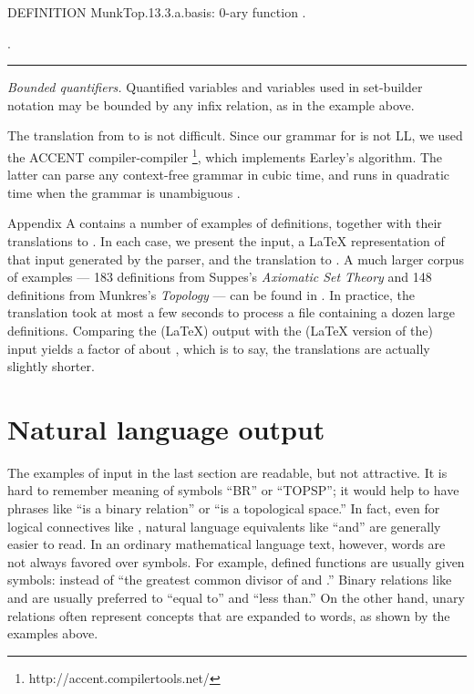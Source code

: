 \documentclass{llncs}
\newcommand{\myrule}{\noindent \rule{\textwidth}{0.3mm}}
\begin{document}
\noindent DEFINITION MunkTop.13.3.a.basis: 0-ary function
.

\noindent .

\myrule

\bigskip

\noindent \emph{Bounded quantifiers.} Quantified variables and
variables used in set-builder notation may be bounded by any infix
relation, as in the example above.

\bigskip

The translation from  to  is not difficult. Since
our grammar for  is not LL, we used the ACCENT compiler-compiler
\footnote{http://accent.compilertools.net/}, which implements
Earley's algorithm. The latter can parse any context-free grammar in
cubic time, and runs in quadratic time when the grammar is unambiguous
\cite{aho:ullman}.

Appendix A contains a number of examples of  definitions,
together with their translations to . In each case, we
present the  input, a \LaTeX{} representation of that input
generated by the parser, and the translation to . A much
larger corpus of examples --- 183 definitions from Suppes's
\emph{Axiomatic Set Theory} \cite{suppes} and 148 definitions from
Munkres's \emph{Topology} \cite{munkres} --- can be found in
\cite{kieffer:07}. In practice, the translation took at most a few
seconds to process a file containing a dozen large
definitions. Comparing the (\LaTeX{})  output with the (\LaTeX{}
version of the)  input yields a factor of about ,
which is to say, the  translations are actually slightly
shorter.

\section{Natural language output}
\label{NLoutputSection}

The examples of  input in the last section are readable, but
not attractive. It is hard to remember meaning of symbols ``BR'' or
``TOPSP''; it would help to have phrases like ``is a binary relation''
or ``is a topological space.'' In fact, even for logical connectives
like , natural language equivalents like ``and'' are generally
easier to read. In an ordinary mathematical language text, however,
words are not always favored over symbols. For example, defined
functions are usually given symbols:  instead of ``the
greatest common divisor of  and .'' Binary relations like 
and  are usually preferred to ``equal to'' and ``less than.'' On
the other hand, unary relations often represent concepts that are
expanded to words, as shown by the examples above.
\end{document}
